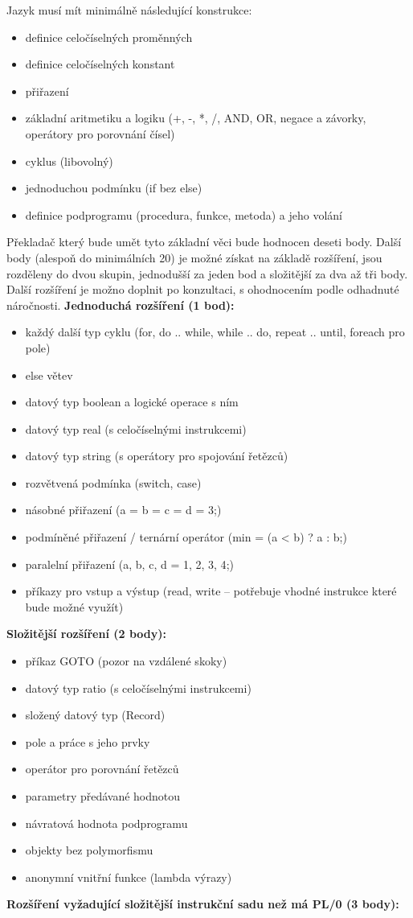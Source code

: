 \documentclass[
12pt,
a4paper,
pdftex,
czech,
titlepage
]{report}
\begin{document}
Jazyk musí mít minimálně následující konstrukce:

\begin{itemize}
\item definice celočíselných proměnných
\item definice celočíselných konstant
\item přiřazení
\item základní aritmetiku a logiku (+, -, *, /, AND, OR, negace a závorky, operátory pro porovnání čísel)
\item cyklus (libovolný)
\item jednoduchou podmínku (if bez else)
\item definice podprogramu (procedura, funkce, metoda) a jeho volání
\end{itemize}

Překladač který bude umět tyto základní věci bude hodnocen deseti body. Další body (alespoň do minimálních 20) je možné získat na základě rozšíření, jsou rozděleny do dvou skupin, jednodušší za jeden bod a složitější za dva až tři body. Další rozšíření je možno doplnit po konzultaci, s ohodnocením podle odhadnuté náročnosti.\newline
\textbf{Jednoduchá rozšíření (1 bod):}
\begin{itemize}
\item každý další typ cyklu (for, do .. while, while .. do, repeat .. until, foreach pro pole)
\item else větev
\item datový typ boolean a logické operace s ním
\item datový typ real (s celočíselnými instrukcemi)
\item datový typ string (s operátory pro spojování řetězců)
\item rozvětvená podmínka (switch, case)
\item násobné přiřazení (a = b = c = d = 3;)
\item podmíněné přiřazení / ternární operátor (min = (a < b) ? a : b;)
\item paralelní přiřazení ({a, b, c, d} = {1, 2, 3, 4};)
\item příkazy pro vstup a výstup (read, write -- potřebuje vhodné instrukce které bude možné využít)
\end{itemize}
\textbf{Složitější rozšíření (2 body):}
\begin{itemize}
\item příkaz GOTO (pozor na vzdálené skoky)
\item datový typ ratio (s celočíselnými instrukcemi)
\item složený datový typ (Record)
\item pole a práce s jeho prvky
\item operátor pro porovnání řetězců
\item parametry předávané hodnotou
\item návratová hodnota podprogramu
\item objekty bez polymorfismu
\item anonymní vnitřní funkce (lambda výrazy)
\end{itemize}
\textbf{Rozšíření vyžadující složitější instrukční sadu než má PL/0 (3 body):}
\end{document}
